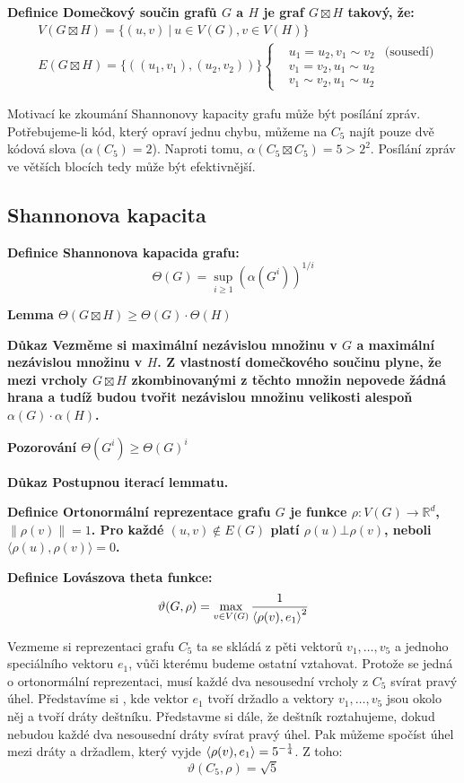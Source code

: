 \documentclass[a4paper,12pt,titlepage]{article}
\newcommand{\shn}{\Theta}
\newcommand{\lm}{\smallskip\noindent\bf Lemma\rm{} }
\newcommand{\dk}{\smallskip\noindent\bf Důkaz\rm{} }
\newcommand{\df}{\smallskip\noindent\bf Definice\rm{} }
\newcommand{\poz}{\smallskip\noindent\bf Pozorování\rm{} }
\newcommand{\R}{\mathbb{R}}
\newcommand{\sk}[1]{{\langle #1\rangle}}
\begin{document}
\df Domečkový součin grafů $G$ a $H$ je graf $G \boxtimes H$ takový, že:
\begin{align*}
	&V(G \boxtimes H) = \{ (u,v) \ |\  u\in V(G), v\in V(H) \} \\
	&E(G \boxtimes H) = \{ ((u_1,v_1),(u_2,v_2))\} \left\{\begin{matrix}
		&u_1 = u_2, v_1 \sim v_2 &\text{(sousedí)} \\
		&v_1 = v_2, u_1 \sim u_2 \\
		&v_1 \sim v_2, u_1 \sim u_2
		\end{matrix}\right.
\end{align*}

Motivací ke zkoumání Shannonovy kapacity grafu může být posílání zpráv.
Potřebujeme-li kód, který opraví jednu chybu, můžeme na $C_5$ najít pouze dvě
kódová slova ($\alpha(C_5) = 2$). Naproti tomu, $\alpha(C_5 \boxtimes C_5) = 5
> 2^2$. Posílání zpráv ve větších blocích tedy může být efektivnější.

\subsection{Shannonova kapacita}
\df Shannonova kapacida grafu:
$$\shn(G) = \sup_{i\ge 1}(\alpha(G^i))^{1/i}$$

\lm $\shn(G\boxtimes H) \ge \shn(G) \cdot \shn(H)$

\dk Vezměme si maximální nezávislou množinu v $G$ a maximální nezávislou
množinu v $H$. Z vlastností domečkového součinu plyne, že mezi vrcholy
$G\boxtimes H$ zkombinovanými z těchto množin nepovede žádná hrana a tudíž
budou tvořit nezávislou množinu velikosti alespoň $\alpha(G)\cdot\alpha(H)$.

\poz $\shn(G^i) \ge \shn(G)^i$

\dk Postupnou iterací lemmatu.

\df Ortonormální reprezentace grafu $G$ je funkce $\rho: V(G) \rightarrow \R^d$,
$\|\rho(v)\| = 1$. Pro každé $(u,v) \not\in E(G)$ platí $\rho(u)\bot\rho(v)$,
neboli $\sk{\rho(u), \rho(v)} = 0$.

\df Lovászova theta funkce:
$$\vartheta(G,\rho) = \max_{v\in V(G)} {1\over \sk{\rho(v),e_1}^2}$$

Vezmeme si reprezentaci grafu $C_5$ ta se skládá z pěti vektorů $v_1, \dots,
v_5$ a jednoho speciálního vektoru $e_1$, vůči kterému budeme ostatní
vztahovat. Protože se jedná o ortonormální reprezentaci, musí každé dva
nesousední vrcholy z $C_5$ svírat pravý úhel. Představíme si ,
kde vektor $e_1$ tvoří držadlo a vektory $v_1, \dots, v_5$ jsou okolo něj a
tvoří dráty deštníku. Představme si dále, že deštník roztahujeme, dokud nebudou každé dva nesousední dráty svírat pravý úhel. Pak můžeme spočíst úhel mezi dráty a držadlem, který vyjde $\sk{\rho(v),e_1} = 5^{-{1\over 4}}$. Z toho:
$$
\vartheta(C_5,\rho) = \sqrt 5
$$
\end{document}
